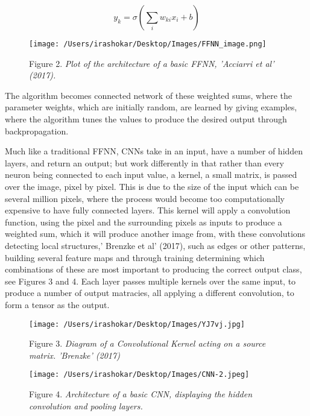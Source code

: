 \documentclass[11pt]{article}
\begin{document}
\[y_k = \sigma(\sum_{i}w_{ki} x_i +b)\]

\begin{figure}[t]
 \centering
 \texttt{[image: /Users/irashokar/Desktop/Images/FFNN\_image.png]} 
 
 Figure 2. \textit{Plot of the architecture of a basic FFNN, 'Acciarri et al' (2017).}
\end{figure}

The algorithm becomes connected network of these weighted sums, where the parameter weights, which are initially random, are learned by giving examples, where the algorithm tunes the values to produce the desired output through backpropagation. 

Much like a traditional FFNN, CNNs take in an input, have a number of hidden layers, and return an output; but work differently in that rather than every neuron being connected to each input value, a kernel, a small matrix, is passed over the image, pixel by pixel. This is due to the size of the input which can be several million pixels, where the process would become too computationally expensive to have fully connected layers. This kernel will apply a convolution function, using the pixel and the surrounding pixels as inputs to produce a weighted sum, which it will produce another image from, with these convolutions detecting local structures,’ Brenzke et al’ (2017), such as edges or other patterns, building several feature maps and through training determining which combinations of these are most important to producing the correct output class, see Figures 3 and 4. Each layer passes multiple kernels over the same input, to produce a number of output matracies, all applying a different convolution, to form a tensor as the output. 

\begin{figure}[t]
 \centering
 \texttt{[image: /Users/irashokar/Desktop/Images/YJ7vj.jpg]} 
 
 Figure 3. \textit{Diagram of a Convolutional Kernel acting on a source matrix. 'Brenzke' (2017)}
 \end{figure}
 
 \begin{figure}
 \centering
 \texttt{[image: /Users/irashokar/Desktop/Images/CNN-2.jpeg]} 
 
 Figure 4. \textit{Architecture of a basic CNN, displaying the hidden convolution and pooling layers.}
 \end{figure}
\end{document}
